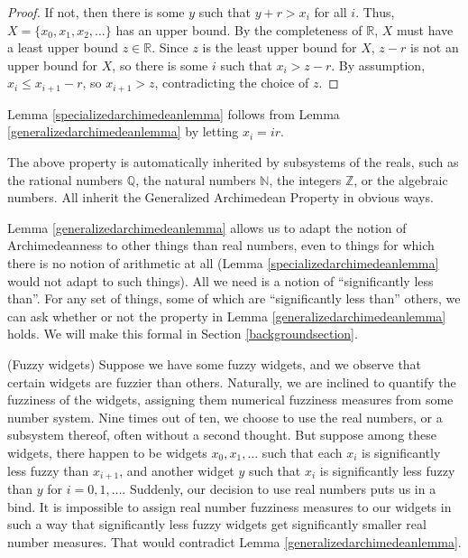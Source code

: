 \documentclass[twoside,11pt]{article}
\begin{document}
\begin{proof}
If not, then there is some $y$ such that $y+r > x_i$ for all $i$.
Thus, $X=\{x_0,x_1,x_2,\ldots\}$ has an upper bound. By the completeness
of $\mathbb R$, $X$ must have a least upper bound $z\in\mathbb R$.
Since $z$ is the least upper bound for $X$, $z-r$ is not an upper bound
for $X$, so there is some $i$ such that $x_i>z-r$.
By assumption, $x_i\leq x_{i+1}-r$, so $x_{i+1}>z$, contradicting the choice
of $z$.
\end{proof}

Lemma \ref{specializedarchimedeanlemma} follows from
Lemma \ref{generalizedarchimedeanlemma} by letting $x_i=ir$.

The above property is automatically inherited by subsystems
of the reals, such as the rational numbers $\mathbb Q$, the natural
numbers $\mathbb N$, the integers $\mathbb Z$, or the algebraic numbers.
All inherit the Generalized Archimedean Property in obvious ways.

Lemma \ref{generalizedarchimedeanlemma} allows us to adapt the notion
of Archimedeanness to other things than real numbers, even to things
for which there is no notion of arithmetic at all
(Lemma \ref{specializedarchimedeanlemma} would not adapt to such things).
All we need is a notion of ``significantly less than''.
For any set of things, some of which are ``significantly less than''
others, we can ask whether or not the property in Lemma
\ref{generalizedarchimedeanlemma} holds. We will make this formal in
Section \ref{backgroundsection}.

\begin{example}
\label{fuzzywidgets}
(Fuzzy widgets)
Suppose we have some fuzzy widgets, and we observe that certain
widgets are fuzzier than others. Naturally, we are inclined to
quantify the fuzziness of the widgets, assigning them numerical
fuzziness measures from some number system. Nine times out of ten,
we choose to use the real numbers, or a subsystem thereof,
often without a second thought. But suppose
among these widgets, there happen to be widgets $x_0,x_1,\ldots$
such that each $x_{i}$ is significantly less fuzzy than $x_{i+1}$,
and another widget $y$ such that $x_i$ is
significantly less fuzzy than $y$ for $i=0,1,\ldots$.
Suddenly, our decision to use real numbers puts us in a bind.
It is impossible to assign real number fuzziness measures to our
widgets in such a way that significantly less fuzzy widgets get
significantly smaller real number measures. That would
contradict Lemma \ref{generalizedarchimedeanlemma}.
\end{example}
\end{document}
